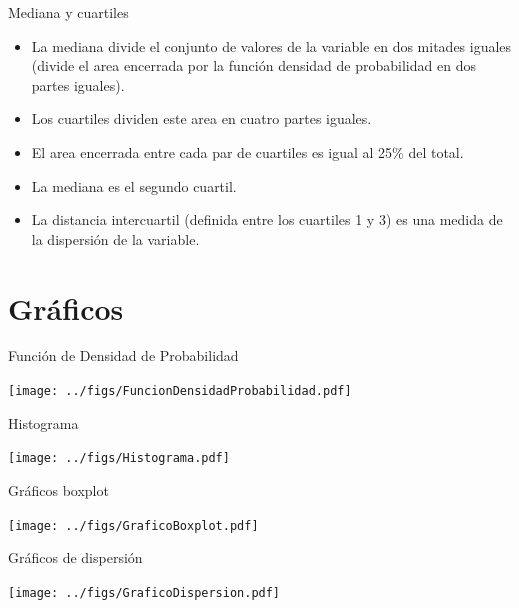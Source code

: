 \documentclass[aspectratio=169, usenames,svgnames,dvipsnames]{beamer}
\begin{document}
\begin{frame}[label={sec:org7b726fb}]{Mediana y cuartiles}
\begin{itemize}
\item La \alert{mediana} divide el conjunto de valores de la variable en \alert{dos
mitades} iguales (divide el area encerrada por la función densidad
de probabilidad en dos partes iguales).
\item Los \alert{cuartiles} dividen este area en \alert{cuatro} partes iguales.
\item El area encerrada entre cada par de cuartiles es igual al 25\% del total.
\item La \alert{mediana} es el \alert{segundo cuartil}.
\item La \alert{distancia intercuartil} (definida entre los cuartiles 1 y 3) es
una \alert{medida de la dispersión} de la variable.
\end{itemize}
\end{frame}


\section{Gráficos}
\label{sec:org81096d5}


\begin{frame}[label={sec:org0b53c15}]{Función de Densidad de Probabilidad}
\begin{center}
\texttt{[image: ../figs/FuncionDensidadProbabilidad.pdf]}
\end{center}
\end{frame}

\begin{frame}[label={sec:org345583e}]{Histograma}
\begin{center}
\texttt{[image: ../figs/Histograma.pdf]}
\end{center}
\end{frame}


\begin{frame}[label={sec:org3c21c32}]{Gráficos boxplot}
\begin{center}
\texttt{[image: ../figs/GraficoBoxplot.pdf]}
\end{center}
\end{frame}


\begin{frame}[label={sec:org3ebb3d8}]{Gráficos de dispersión}
\begin{center}
\texttt{[image: ../figs/GraficoDispersion.pdf]}
\end{center}
\end{frame}
\end{document}
